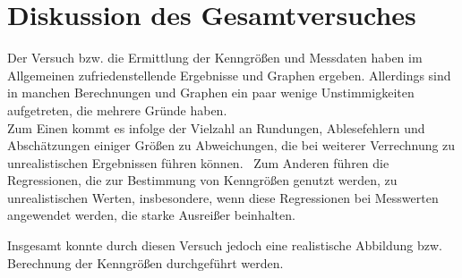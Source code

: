 \section{Diskussion des Gesamtversuches}

Der Versuch bzw. die Ermittlung der Kenngrößen und Messdaten haben im Allgemeinen zufriedenstellende Ergebnisse und Graphen ergeben. Allerdings sind in manchen Berechnungen und Graphen ein paar wenige Unstimmigkeiten aufgetreten, die mehrere Gründe haben.\\
Zum Einen kommt es infolge der Vielzahl an Rundungen, Ablesefehlern und Abschätzungen einiger Größen zu Abweichungen, die bei weiterer Verrechnung zu unrealistischen Ergebnissen führen können. \ Zum Anderen führen die Regressionen, die zur Bestimmung von Kenngrößen genutzt werden, zu unrealistischen Werten, insbesondere, wenn diese Regressionen bei Messwerten angewendet werden, die starke Ausreißer beinhalten.

Insgesamt konnte durch diesen Versuch jedoch eine realistische Abbildung bzw. Berechnung der Kenngrößen durchgeführt werden.